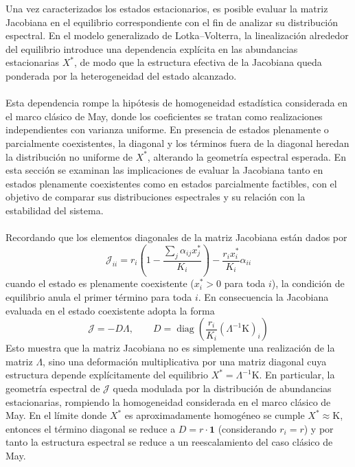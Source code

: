 Una vez caracterizados los estados estacionarios, es posible evaluar la matriz Jacobiana en el equilibrio correspondiente con el fin de analizar su distribución espectral. En el modelo generalizado de Lotka--Volterra, la linealización alrededor del equilibrio introduce una dependencia explícita en las abundancias estacionarias $X^*$, de modo que la estructura efectiva de la Jacobiana queda ponderada por la heterogeneidad del estado alcanzado.
\\
\\
Esta dependencia rompe la hipótesis de homogeneidad estadística considerada en el marco clásico de May, donde los coeficientes se tratan como realizaciones independientes con varianza uniforme. En presencia de estados plenamente o parcialmente coexistentes, la diagonal y los términos fuera de la diagonal heredan la distribución no uniforme de $X^*$, alterando la geometría espectral esperada. En esta sección se examinan las implicaciones de evaluar la Jacobiana tanto en estados plenamente coexistentes como en estados parcialmente factibles, con el objetivo de comparar sus distribuciones espectrales y su relación con la estabilidad del sistema.\\
\\
Recordando que los elementos diagonales de la matriz Jacobiana están dados por 
$$\mathcal{J}_{ii}=r_i\left (1-\frac{\sum_j\alpha_{ij}x_j^*}{K_i}\right )-\frac{r_ix_i^*}{K_i}\alpha_{ii}$$
cuando el estado es plenamente coexistente ($x_i^*>0$ para toda $i$), la condición de equilibrio anula el primer término para toda $i$. En consecuencia la Jacobiana evaluada en el estado coexistente adopta la forma
\begin{equation}\label{eqn:JacobianaCoexistente}
	\mathcal{J}=-D\Lambda,\qquad D=\operatorname{diag}\left (\frac{r_i}{K_i}(\Lambda^{-1}\mathrm{K})_i\right )
\end{equation}
Esto muestra que la matriz Jacobiana no es simplemente una realización de la matriz $\Lambda$, sino una deformación multiplicativa por una matriz diagonal cuya estructura depende explícitamente del equilibrio $X^*=\Lambda^{-1}\mathrm{K}$. En particular, la geometría espectral de $\mathcal{J}$ queda modulada por la distribución de abundancias estacionarias, rompiendo la homogeneidad considerada en el marco clásico de May. En el límite donde $X^*$ es aproximadamente homogéneo se cumple $X^*\approx\mathrm{K}$, entonces  el término diagonal se reduce a $D=r\cdot\textbf{1}$ (considerando $r_i=r$) y por tanto la estructura espectral se reduce a un reescalamiento del caso clásico de May.\\
